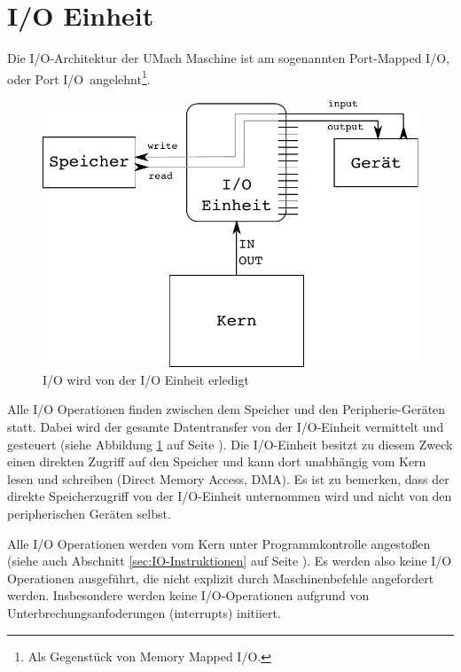 \section{I/O Einheit}
\label{sec:IO-Einheit}

Die I/O-Architektur der UMach Maschine ist am sogenannten \glqq Port-Mapped
I/O\grqq, oder \glqq Port I/O\grqq\ angelehnt\footnote{Als Gegenstück von \glqq
Memory Mapped I/O\grqq.}.

\begin{figure}[htp]
 \centering
 \includegraphics{./img/UMach-IO-Prozess.pdf}
 \caption{I/O wird von der I/O Einheit erledigt}
 \label{fig:UMach-IO-Prozess}
\end{figure}

Alle I/O Operationen finden zwischen dem Speicher und den Peripherie-Geräten
statt. Dabei wird der gesamte Datentransfer von der I/O-Einheit vermittelt und
gesteuert (siehe Abbildung \ref{fig:UMach-IO-Prozess} auf Seite
\pageref{fig:UMach-IO-Prozess}). Die I/O-Einheit besitzt zu diesem Zweck einen
direkten Zugriff auf den Speicher und kann dort unabhängig vom Kern lesen und
schreiben (Direct Memory Access, DMA). Es ist zu bemerken, dass
der direkte Speicherzugriff von der I/O-Einheit unternommen wird und nicht von
den peripherischen Geräten selbst.

Alle I/O Operationen werden vom Kern unter Programmkontrolle angestoßen (siehe
auch Abschnitt \ref{sec:IO-Instruktionen} auf Seite
\pageref{sec:IO-Instruktionen}). Es werden also keine I/O Operationen
ausgeführt, die nicht explizit durch Maschinenbefehle angefordert werden.
Insbesondere werden keine I/O-Operationen aufgrund von
Unterbrechungsanfoderungen (interrupts) initiiert.

